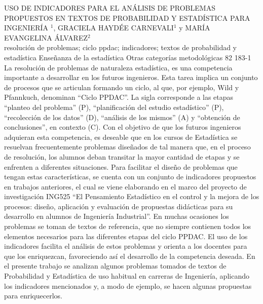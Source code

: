 \A
{USO DE INDICADORES PARA EL ANÁLISIS DE PROBLEMAS PROPUESTOS EN TEXTOS DE PROBABILIDAD Y ESTADÍSTICA PARA INGENIERÍA}
{$^1$, GRACIELA HAYDÉE CARNEVALI$^1$ y MARÍA EVANGELINA ÁLVAREZ$^2$}
{
\\}
{resolución de problemas; ciclo ppdac; indicadores; textos de probabilidad y estadística} 
 {Enseñanza de la estadística} 
 {Otras categorías metodológicas} 
 {82} 
 {183-1}
{La resolución de problemas de naturaleza estadística, es una competencia importante a desarrollar en los futuros ingenieros. Esta tarea implica un conjunto de procesos que se articulan formando un ciclo, al que, por ejemplo, Wild y Pfannkuch, denominan “Ciclo PPDAC”. La sigla corresponde a las etapas “planteo del problema” (P), “planificación del estudio estadístico” (P), “recolección de los datos” (D), “análisis de los mismos” (A) y “obtención de conclusiones”, en contexto (C). Con el objetivo de que los futuros ingenieros adquieran esta competencia, es deseable que en los cursos de Estadística se resuelvan frecuentemente problemas diseñados de tal manera que, en el proceso de resolución, los alumnos deban transitar la mayor cantidad de etapas y se enfrenten a diferentes situaciones. Para facilitar el diseño de problemas que tengan estas características, se cuenta con un conjunto de indicadores propuestos en trabajos anteriores, el cual se viene elaborando en el marco del proyecto de investigación ING525 “El Pensamiento Estadístico en el control y la mejora de los procesos: diseño, aplicación y evaluación de propuestas didácticas para su desarrollo en alumnos de Ingeniería Industrial”. En muchas ocasiones los problemas se toman de textos de referencia, que no siempre contienen todos los elementos necesarios para las diferentes etapas del ciclo PPDAC. El uso de los indicadores facilita el análisis de estos problemas y orienta a los docentes para que los enriquezcan, favoreciendo así el desarrollo de la competencia deseada. En el presente trabajo se analizan algunos problemas tomados de textos de Probabilidad y Estadística de uso habitual en carreras de Ingeniería, aplicando los indicadores mencionados y, a modo de ejemplo, se hacen algunas propuestas para enriquecerlos. }
